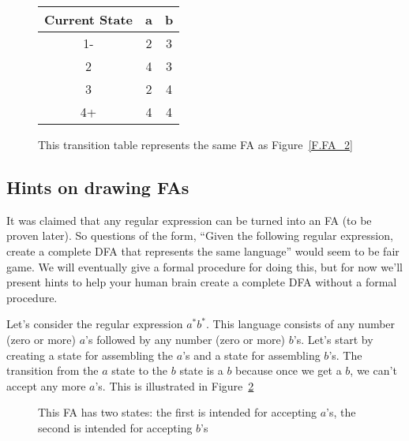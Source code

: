 \documentclass[letterpaper,12pt,openany,reqno]{book}%
\newcommand{\fanonterminalnode}[2] {\node at (#1) (#2) [circle, draw, minimum size=24pt] {#2};}
\newcommand{\fatransition}[3] {\draw [->] (#1) -- (#2) node [midway, above] {#3};}
\begin{document}
\begin{figure}[hbt]
\centering
\begin{tabular}{|c|c|c|}
\hline
Current State & a & b \\
\hline
1- & 2 & 3 \\
\hline
2 & 4 & 3 \\
\hline
3 & 2 & 4 \\
\hline
4+ & 4 & 4 \\
\hline
\end{tabular}
\caption[Transition Table]{This transition table represents the same FA as Figure~\ref{F.FA_2}}
\label{T.FA.2}
\end{figure}

\subsection{Hints on drawing FAs}
It was claimed that any regular expression can be turned into an FA (to be proven later). So questions of the form, ``Given the following regular expression, create a complete DFA that represents the same language'' would seem to be fair game. We will eventually give a formal procedure for doing this, but for now we'll present hints to help your human brain create a complete DFA without a formal procedure.

Let's consider the regular expression $a^* b^*$. This language consists of any number (zero or more) $a$'s followed by any number (zero or more) $b$'s. Let's start by creating a state for assembling the $a$'s and a state for assembling $b$'s. The transition from the $a$ state to the $b$ state is a $b$ because once we get a $b$, we can't accept any more $a$'s. This is illustrated in Figure~\ref{F.FA_ab1}

\begin{figure}[hbt]
\centering
{}
 \caption[Step 1 in drawing an FA for $a^* b^*$]{This FA has two states: the first is intended for accepting $a$'s, the second is intended for accepting $b$'s}
  \label{F.FA_ab1}
\end{figure}
\end{document}
